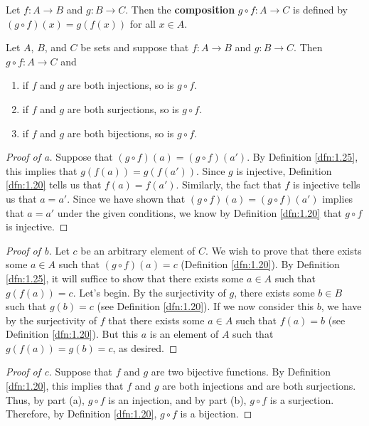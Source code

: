 \documentclass[../main.tex]{subfiles}
\begin{document}

\begin{definition}\label{dfn:1.25}
    Let $f:A\to B$ and $g:B\to C$. Then the \textbf{composition} $g\circ f:A\to C$ is defined by $(g\circ f)(x)=g(f(x))$ for all $x\in A$.
\end{definition}

\begin{proposition}\label{prp:1.26}
    Let $A$, $B$, and $C$ be sets and suppose that $f:A\to B$ and $g:B\to C$. Then $g\circ f:A\to C$ and
    \begin{enumerate}[label={\alph*\textup{)}}]
        \item if $f$ and $g$ are both injections, so is $g\circ f$.
        \item if $f$ and $g$ are both surjections, so is $g\circ f$.
        \item if $f$ and $g$ are both bijections, so is $g\circ f$.
    \end{enumerate}
    \begin{proof}[Proof of a]
        Suppose that $(g\circ f)(a)=(g\circ f)(a')$. By Definition \ref{dfn:1.25}, this implies that $g(f(a))=g(f(a'))$. Since $g$ is injective, Definition \ref{dfn:1.20} tells us that $f(a)=f(a')$. Similarly, the fact that $f$ is injective tells us that $a=a'$. Since we have shown that $(g\circ f)(a)=(g\circ f)(a')$ implies that $a=a'$ under the given conditions, we know by Definition \ref{dfn:1.20} that $g\circ f$ is injective.
    \end{proof}
    \begin{proof}[Proof of b]
        Let $c$ be an arbitrary element of $C$. We wish to prove that there exists some $a\in A$ such that $(g\circ f)(a)=c$ (Definition \ref{dfn:1.20}). By Definition \ref{dfn:1.25}, it will suffice to show that there exists some $a\in A$ such that $g(f(a))=c$. Let's begin. By the surjectivity of $g$, there exists some $b\in B$ such that $g(b)=c$ (see Definition \ref{dfn:1.20}). If we now consider this $b$, we have by the surjectivity of $f$ that there exists some $a\in A$ such that $f(a)=b$ (see Definition \ref{dfn:1.20}). But this $a$ is an element of $A$ such that $g(f(a))=g(b)=c$, as desired.
    \end{proof}
    \begin{proof}[Proof of c]
        Suppose that $f$ and $g$ are two bijective functions. By Definition \ref{dfn:1.20}, this implies that $f$ and $g$ are both injections and are both surjections. Thus, by part (a), $g\circ f$ is an injection, and by part (b), $g\circ f$ is a surjection. Therefore, by Definition \ref{dfn:1.20}, $g\circ f$ is a bijection.
    \end{proof}
\end{proposition}
\end{document}
